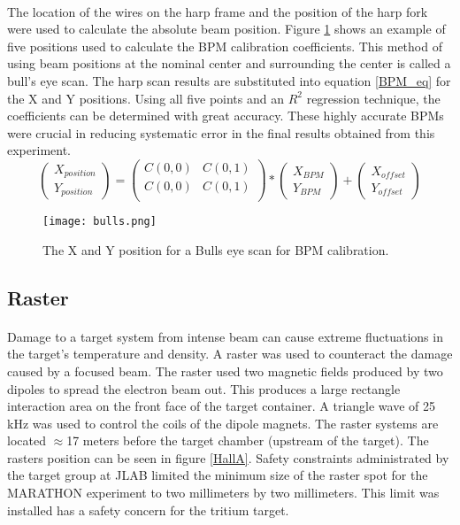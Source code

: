 		\paragraph{}The location of the wires on the harp frame and the position of the harp fork were used to calculate the absolute beam position. Figure \ref{bulls} shows an example of five positions used to calculate the BPM calibration coefficients. This method of using beam positions at the nominal center and surrounding the center is called a bull's eye scan. The harp scan results are substituted into equation \ref{BPM_eq} for the X and Y positions. Using all five points and an $R^2$ regression technique, the coefficients can be determined with great accuracy. These highly accurate BPMs were crucial in reducing systematic error in the final results obtained from this experiment. 
		\begin{equation}
		\label{BPM_eq}
		\begin{pmatrix}
		X_{position}\\
		Y_{position}
		\end{pmatrix}
		=
		\begin{pmatrix}
		C(0,0) & C(0,1)\\
		C(0,0) & C(0,1)\\
		\end{pmatrix}
		*
		\begin{pmatrix}
		X_{BPM}\\
		Y_{BPM}
		\end{pmatrix}
		+
		\begin{pmatrix}
		X_{offset}\\
		Y_{offset}
		\end{pmatrix}			 
		\end{equation}
		
		\begin{figure}[t]
			\centering
			\caption{The X and Y position for a Bulls eye scan for BPM calibration. }
			\label{bulls}
			\texttt{[image: bulls.png]} 
		\end{figure} 	

	 \subsection{Raster}
	 \paragraph{} Damage to a target system from intense beam can cause extreme fluctuations in the target's temperature and density. A raster was used to counteract the damage caused by a focused beam. The raster used two magnetic fields produced by two dipoles to spread the electron beam out. This produces a large rectangle interaction area on the front face of the target container. A triangle wave of 25 kHz was used to control the coils of the dipole magnets. The raster systems are located $\approx$17 meters before the target chamber (upstream of the target\cite{BPM2}). The rasters position can be seen in figure \ref{HallA}. Safety constraints administrated by the target group at JLAB limited the minimum size of the raster spot for the MARATHON experiment to two millimeters by two millimeters. This limit was installed has a safety concern for the tritium target. 
